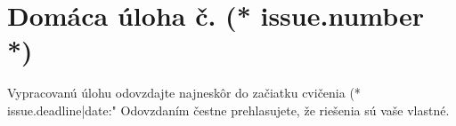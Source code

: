 \documentclass[12pt, twoside]{dgs}
\begin{document}
    \pagestyle{handout}
    \setcounter{section}{(* issue.number - 1 *)}
    \section{Domáca úloha č. (* issue.number *)}
    \begin{center}
        Vypracovanú úlohu odovzdajte najneskôr do začiatku cvičenia (* issue.deadline|date:"%
        Odovzdaním čestne prehlasujete, že riešenia sú vaše vlastné.
    \end{center}
    
\end{document}
